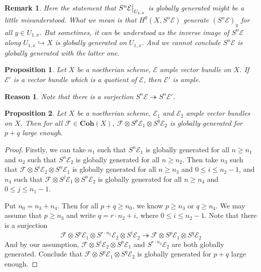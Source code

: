 \documentclass{ctexart}
\newtheorem{remark}{Remark}[section]
\newtheorem{proposition}{Proposition}[section]
\newtheorem{reason}{Reason}[section]
\newcommand{\coherent}{\mathbf{Coh}}
\begin{document}
\begin{remark}
    Here the statement that $S^{n}\mathcal{E}\big{|}_{U_{1, x}}$ is globally generated might be a little misunderstood.
    What we mean is that $H^{0}(X, S^{n}\mathcal{E})$ generate $(S^{n}\mathcal{E})_{y}$ for all $y\in U_{1, x}$.
    But sometimes, it can be understood as the inverse image of $S^{n}\mathcal{E}$ along $U_{1, x} \hookrightarrow X$ is globally generated on $U_{1, x}$.
    And we cannot conclude $S^{n}\mathcal{E}$ is globally generated with the latter one.
\end{remark}
\begin{proposition}
    Let $X$ be a noetherian scheme, $\mathcal{E}$ ample vector bundle on $X$.
    If $\mathcal{E}'$ is a vector bundle which is a quotient of $\mathcal{E}$,
    then $\mathcal{E}'$ is ample.
    \label{Proposition 4.8}
\end{proposition}
\begin{reason}
    Note that there is a surjection $S^{n}\mathcal{E} \twoheadrightarrow S^{n}\mathcal{E}'$.
\end{reason}
\begin{proposition}
    Let $X$ be a noetherian scheme, $\mathcal{E}_{1}$ and $\mathcal{E}_{2}$ ample vector bundles on $X$.
    Then for all $\mathcal{F}\in \coherent (X)$, $\mathcal{F} \otimes S^{p}\mathcal{E}_{1} \otimes S^{q}\mathcal{E}_{2}$ is globally generated for $p + q$ large enough.
    \label{Proposition 4.9}
\end{proposition}
\begin{proof}
    Firstly, we can take $n_{1}$ such that $S^{n}\mathcal{E}_{1}$ is globally generated for all $n \ge n_{1}$ and $n_{2}$ such that $S^{n}\mathcal{E}_{2}$ is globally generated for all $n \ge n_{2}$.
    Then take $n_{3}$ such that $\mathcal{F} \otimes S^{i}\mathcal{E}_{2} \otimes S^{n}\mathcal{E}_{1}$ is globally generated for all $n \ge n_{3}$ and $0 \le i \le n_{2} - 1$,
    and $n_{4}$ such that $\mathcal{F} \otimes S^{j}\mathcal{E}_{1} \otimes S^{n}\mathcal{E}_{2}$ is globally generated for all $n \ge n_{4}$ and $0 \le j \le n_{1} - 1$.
    \par
    Put $n_{0} = n_{3} + n_{4}$.
    Then for all $p + q \ge n_{0}$, we know $p \ge n_{3}$ or $q \ge n_{4}$.
    We may assume that $p \ge n_{3}$ and write $q = r \cdot n_{2} + i$, where $0 \le i \le n_{2} - 1$.
    Note that there is a surjection
    \begin{equation}
        \mathcal{F} \otimes S^{p}\mathcal{E}_{1} \otimes S^{r \cdot n_{2}}\mathcal{E}_{2} \otimes S^{i}\mathcal{E}_{2} \twoheadrightarrow \mathcal{F} \otimes S^{p}\mathcal{E}_{1} \otimes S^{q}\mathcal{E}_{2}
    \end{equation}
    And by our assumption, $\mathcal{F} \otimes S^{i}\mathcal{E}_{2} \otimes S^{p}\mathcal{E}_{1}$ and $S^{r \cdot n_{2}}\mathcal{E}_{2}$ are both globally generated.
    Conclude that $\mathcal{F} \otimes S^{p}\mathcal{E}_{1} \otimes S^{q}\mathcal{E}_{2}$ is globally generated for $p + q$ large enough.
\end{proof}
\end{document}
